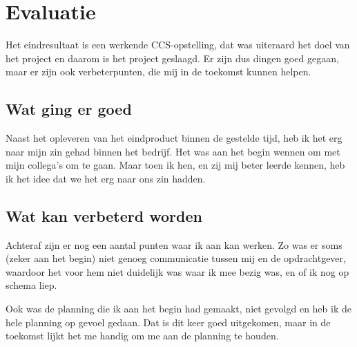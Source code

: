 \chapter{Evaluatie}
\label{Evaluatie}

Het eindresultaat is een werkende CCS-opstelling, dat was uiteraard het doel
van het project en daarom is het project geslaagd. Er zijn dus dingen goed
gegaan, maar er zijn ook verbeterpunten, die mij in de toekomst kunnen helpen.

\section{Wat ging er goed}

Naast het opleveren van het eindproduct binnen de gestelde tijd, heb ik het erg
naar mijn zin gehad binnen het bedrijf. Het was aan het begin wennen om met
mijn collega's om te gaan. Maar toen ik hen, en zij mij beter leerde kennen,
heb ik het idee dat we het erg naar ons zin hadden.

\section{Wat kan verbeterd worden}

Achteraf zijn er nog een aantal punten waar ik aan kan werken. Zo was er soms
(zeker aan het begin) niet genoeg communicatie tussen mij en de opdrachtgever,
waardoor het voor hem niet duidelijk was waar ik mee bezig was, en of ik nog op
schema liep.

Ook was de planning die ik aan het begin had gemaakt, niet gevolgd en heb ik de
hele planning op gevoel gedaan. Dat is dit keer goed uitgekomen, maar in de
toekomst lijkt het me handig om me aan de planning te houden.